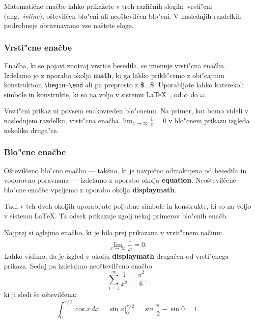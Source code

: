 \documentclass[sigconf,nonacm]{acmart}
\begin{document}
Matematične enačbe lahko prikažete v treh različnih slogih:\ vrsti"cni (ang.\
\emph{inline}), oštevilčen blo"cni ali neoštevilčen blo"cni.  V naslednjih
razdelkih podrobneje obravnavamo vse naštete sloge.

\subsubsection{Vrsti"cne enačbe}

Enačba, ki se pojavi znotraj vrstice besedila, se imenuje vrsti"cna enačba.
Izdelamo jo z uporabo okolja \textbf{math}, ki ga lahko prikli"cemo z
obi"cajnim konstruktom
\texttt{\textbackslash{}begin}--\texttt{\textbackslash{}end} ali pa preprosto
z \textbf{\$$\ldots$\$}.  Uporabljate lahko katerekoli simbole in konstrukte,
ki so na voljo v sistemu \LaTeX~\cite{Lamport:LaTeX}, od $\alpha$ do $\omega$.

Vrsti"cni prikaz ni povsem enakovreden blo"cnemu. Na primer, kot bomo videli
v naslednjem razdelku, vrsti"cna enačba
\begin{math}\lim_{x\rightarrow \infty}\frac{1}{x}=0\end{math} 
v blo"cnem prikazu izgleda nekoliko druga"ce.

\subsubsection{Blo"cne enačbe}

Oštevilčeno blo"cno enačbo --- takšno, ki je navpično odmaknjena od besedila
in vodoravno poravnana --- izdelamo z uporabo okolja \textbf{equation}.
Neoštevilčene blo"cne enačbe vpeljemo z uporabo okolja \textbf{displaymath}.

Tudi v teh dveh okoljih uporabljate poljubne simbole in konstrukte, ki so na
voljo v sistemu \LaTeX. Ta odsek prikazuje zgolj nekaj primerov blo"cnih
enačb.

Najprej si oglejmo enačbo, ki je bila prej prikazana v vrsti"cnem načinu: 
%
\begin{equation}
\lim_{x\rightarrow \infty}\frac{1}{x}=0.
\end{equation}
%
Lahko vidimo, da je izgled v okolju \textbf{displaymath} drugačen od vrsti"cnega
prikaza.  Sedaj pa izdelajmo neoštevilčeno enačbo
%
\begin{displaymath}
    \sum_{i=1}^{\infty} \frac{1}{x^2} = \frac{\pi^2}{6},
\end{displaymath}
%
ki ji sledi še oštevilčena:
%
\begin{equation}
    \int_{0}^{\pi/2} \cos x\,dx = \sin x\bigg\rvert_{0}^{\pi/2} = \sin
    \frac{\pi}{2} - \sin 0 = 1.
\end{equation}
\end{document}
